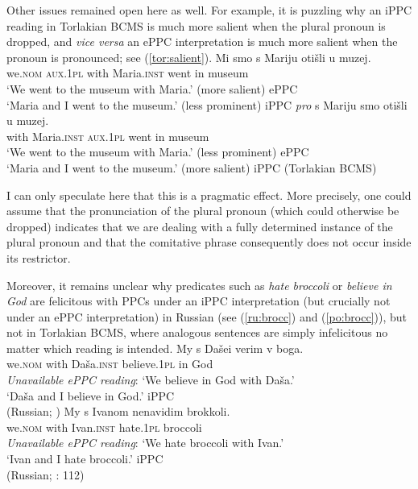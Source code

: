 \documentclass[output=paper,colorlinks,citecolor=brown]{langscibook}
\begin{document}
Other issues remained open here as well. For example, it is puzzling why an iPPC reading in Torlakian BCMS is much more salient when the plural pronoun is dropped, and \textit{vice versa} an ePPC interpretation is much more salient when the pronoun is pronounced; see (\ref{tor:salient}). 
\ea \label{tor:salient} \ea
\gll Mi smo s Mariju otišli u muzej. \\
 we.\textsc{nom} \textsc{aux.1pl} with Maria.\textsc{inst} went in museum \\
 \glt `We went to the museum with Maria.' \hfill (more salient) ePPC\\
 `Maria and I went to the museum.' \hfill (less prominent) iPPC
\ex
\gll \textit{pro} s Mariju smo otišli u muzej. \\
 {} with Maria.\textsc{inst} \textsc{aux.1pl} went in museum \\
 \glt `We went to the museum with Maria.' \hfill (less prominent) ePPC\\
 `Maria and I went to the museum.' \hfill (more salient) iPPC
\z \hfill (Torlakian BCMS)\z 

\noindent I can only speculate here that this is a pragmatic effect. More precisely, one could assume that the pronunciation of the plural pronoun (which could otherwise be dropped) indicates that we are dealing with a fully determined instance of the plural pronoun and that the comitative phrase consequently does not occur inside its restrictor. 


Moreover, it remains unclear why predicates such as \textit{hate broccoli} or \textit{believe in God} are felicitous with PPCs under an iPPC interpretation (but crucially not under an ePPC interpretation) in Russian (see (\ref{ru:brocc}) and (\ref{po:brocc})), but not in Torlakian BCMS, where analogous sentences are simply infelicitous no matter which reading is intended.
\ea \ea
\gll My s Dašei verim v boga. \\
 we.\textsc{nom} with Daša.\textsc{inst} believe.\textsc{1pl} in God \\
 \glt \textit{Unavailable ePPC reading}: `We believe in God with Daša.' \\
 `Daša and I believe in God.' \hfill iPPC \\
 \hfill (Russian; \cite{Feldman2003}) \label{ru:brocc}
\ex
\gll My s Ivanom nenavidim brokkoli. \\
 we.\textsc{nom} with Ivan.\textsc{inst} hate.\textsc{1pl} broccoli \\
 \glt \textit{Unavailable ePPC reading}: `We hate broccoli with Ivan.' \hfill \\
 `Ivan and I hate broccoli.' \hfill iPPC \\
 \hfill (Russian; \cite{VassilievaLarson2005}: 112) \label{po:brocc}
\z \z 
\end{document}
